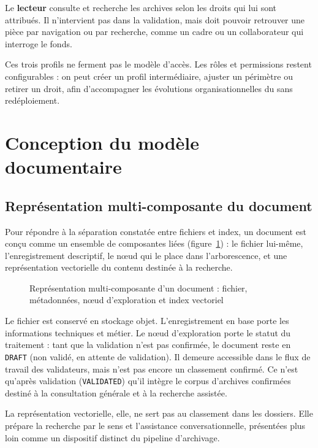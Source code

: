 Le \textbf{lecteur} consulte et recherche les archives selon les droits qui lui sont attribués. Il n'intervient pas dans la validation, mais doit pouvoir retrouver une pièce par navigation ou par recherche, comme un cadre ou un collaborateur qui interroge le fonds.

Ces trois profils ne ferment pas le modèle d'accès. Les rôles et permissions restent configurables : on peut créer un profil intermédiaire, ajuster un périmètre ou retirer un droit, afin d'accompagner les évolutions organisationnelles du \nomMinistere{} sans redéploiement.

\section{Conception du modèle documentaire}

\subsection{Représentation multi-composante du document}

Pour répondre à la séparation constatée entre fichiers et index, un document est conçu comme un ensemble de composantes liées (figure~\ref{fig:modele-documentaire}) : le fichier lui-même, l'enregistrement descriptif, le nœud qui le place dans l'arborescence, et une représentation vectorielle du contenu destinée à la recherche.

\begin{figure}[htbp]
\centering

\caption{Représentation multi-composante d'un document : fichier, métadonnées, nœud d'exploration et index vectoriel}
\label{fig:modele-documentaire}
\end{figure}

Le fichier est conservé en stockage objet. L'enregistrement en base porte les informations techniques et métier. Le nœud d'exploration porte le statut du traitement : tant que la validation n'est pas confirmée, le document reste en \texttt{DRAFT} (non validé, en attente de validation). Il demeure accessible dans le flux de travail des validateurs, mais n'est pas encore un classement confirmé. Ce n'est qu'après validation (\texttt{VALIDATED}) qu'il intègre le corpus d'archives confirmées destiné à la consultation générale et à la recherche assistée.

La représentation vectorielle, elle, ne sert pas au classement dans les dossiers. Elle prépare la recherche par le sens et l'assistance conversationnelle, présentées plus loin comme un dispositif distinct du pipeline d'archivage.

